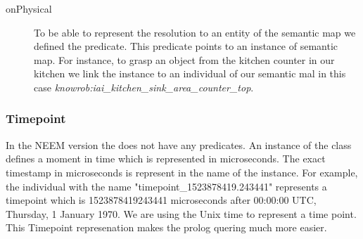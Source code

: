 	\begin{description}
		\item[onPhysical] 
			To be able to represent the resolution to an entity of the semantic map we defined the  predicate.
			This predicate points to an instance of semantic map.
			For instance, to grasp an object from the kitchen counter in our kitchen we link the  instance to an individual of our semantic mal in this case \textit{knowrob:iai\_kitchen\_sink\_area\_counter\_top}.
	\end{description}

\subsubsection{Timepoint}
	In the NEEM version \neemversion the  does not have any predicates.
	An instance of the  class defines a moment in time which is represented in microseconds.
	The exact timestamp in microseconds is represent in the name of the instance.
	For example, the individual with the name "timepoint\_1523878419.243441" represents a timepoint which is 1523878419243441 microseconds after 00:00:00 UTC, Thursday, 1 January 1970.
	We are using the Unix time to represent a time point\cite{matthew2011beginning}.
	This Timepoint represenation makes the prolog quering much more easier.



